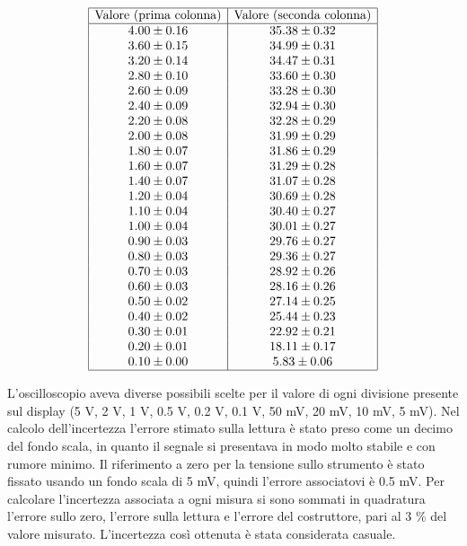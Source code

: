 \documentclass[a4paper,11pt]{article}
\begin{document}
\[
\begin{array}{|c|c|}
\hline
\text{Valore (prima colonna)} & \text{Valore (seconda colonna)} \\ \hline
4.00 \pm 0.16 & 35.38 \pm 0.32 \\ 
3.60 \pm 0.15 & 34.99 \pm 0.31 \\ 
3.20 \pm 0.14 & 34.47 \pm 0.31 \\ 
2.80 \pm 0.10 & 33.60 \pm 0.30 \\ 
2.60 \pm 0.09 & 33.28 \pm 0.30 \\ 
2.40 \pm 0.09 & 32.94 \pm 0.30 \\ 
2.20 \pm 0.08 & 32.28 \pm 0.29 \\ 
2.00 \pm 0.08 & 31.99 \pm 0.29 \\ 
1.80 \pm 0.07 & 31.86 \pm 0.29 \\ 
1.60 \pm 0.07 & 31.29 \pm 0.28 \\ 
1.40 \pm 0.07 & 31.07 \pm 0.28 \\ 
1.20 \pm 0.04 & 30.69 \pm 0.28 \\ 
1.10 \pm 0.04 & 30.40 \pm 0.27 \\ 
1.00 \pm 0.04 & 30.01 \pm 0.27 \\ 
0.90 \pm 0.03 & 29.76 \pm 0.27 \\ 
0.80 \pm 0.03 & 29.36 \pm 0.27 \\ 
0.70 \pm 0.03 & 28.92 \pm 0.26 \\ 
0.60 \pm 0.03 & 28.16 \pm 0.26 \\ 
0.50 \pm 0.02 & 27.14 \pm 0.25 \\ 
0.40 \pm 0.02 & 25.44 \pm 0.23 \\ 
0.30 \pm 0.01 & 22.92 \pm 0.21 \\ 
0.20 \pm 0.01 & 18.11 \pm 0.17 \\ 
0.10 \pm 0.00 & 5.83 \pm 0.06 \\ \hline
\end{array}
\]




L'oscilloscopio aveva diverse possibili scelte per il valore di ogni divisione presente sul display (5 V, 2 V, 1 V, 0.5 V, 0.2 V, 0.1 V, 50 mV, 20 mV, 10 mV, 5 mV). Nel calcolo dell'incertezza l'errore stimato sulla lettura è stato preso come un decimo del fondo scala, in quanto il segnale si presentava in modo molto stabile e con rumore minimo. Il riferimento a zero per la tensione sullo strumento è stato fissato usando un fondo scala di 5 mV, quindi l'errore associatovi è 0.5 mV. Per calcolare l'incertezza associata a ogni misura si sono sommati in quadratura l'errore sullo zero, l'errore sulla lettura e l'errore del costruttore, pari al 3 \% del valore misurato. L'incertezza così ottenuta è stata considerata casuale.
 
\end{document}
